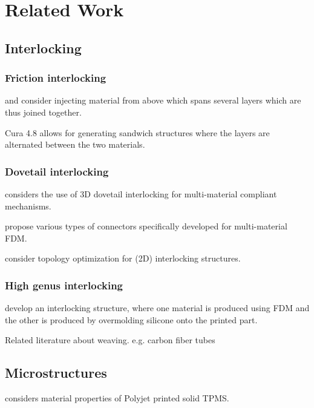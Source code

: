 \section{Related Work}

\subsection{Interlocking}

\subsubsection{Friction interlocking}

\cite{Duty2019} and \cite{Kazmer2020} consider injecting material from above which spans several layers which are thus joined together.

Cura 4.8 allows for generating sandwich structures where the layers are alternated between the two materials.

\subsubsection{Dovetail interlocking}

\cite{gouker2006manufacturing} considers the use of 3D dovetail interlocking for multi-material compliant mechanisms.

\cite{debora2020} propose various types of connectors specifically developed for multi-material FDM.

\cite{aharoni2021} consider topology optimization for (2D) interlocking structures.

\subsubsection{High genus interlocking}

\cite{Rossing2019} develop an interlocking structure, where one material is produced using FDM and the other is produced by overmolding silicone onto the printed part.


Related literature about weaving. e.g. carbon fiber tubes


\subsection{Microstructures}

\cite{Afshar2016} considers material properties of Polyjet printed solid TPMS.

